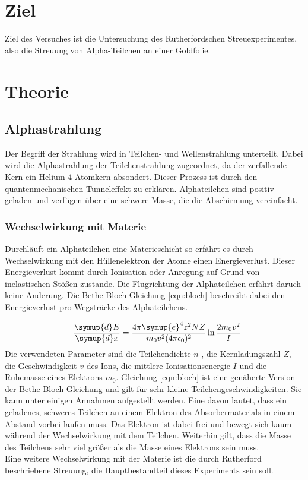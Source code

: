 \section{Ziel}
Ziel des Versuches ist die Untersuchung des Rutherfordschen Streuexperimentes,
also die Streuung von Alpha-Teilchen an einer Goldfolie.

\section{Theorie}
\subsection{Alphastrahlung}
Der Begriff der Strahlung wird in Teilchen- und Wellenstrahlung unterteilt. Dabei
wird die Alphastrahlung der Teilchenstrahlung zugeordnet, da der zerfallende
Kern ein Helium-4-Atomkern absondert. Dieser Prozess ist durch den quantenmechanischen
Tunneleffekt zu erklären. Alphateilchen sind positiv geladen und verfügen über
eine schwere Masse, die die Abschirmung vereinfacht. \cite{potsdam}

\subsubsection{Wechselwirkung mit Materie}
Durchläuft ein Alphateilchen eine Materieschicht so erfährt es durch
Wechselwirkung mit den Hüllenelektron der Atome einen Energieverlust. Dieser
Energieverlust kommt durch Ionisation oder Anregung auf Grund von inelastischen
Stößen zustande. Die Flugrichtung der Alphateilchen erfährt daruch keine
Änderung. Die Bethe-Bloch Gleichung \eqref{eqn:bloch} beschreibt dabei den
Energieverlust pro Wegsträcke des Alphateilchens.

\begin{equation}
- \frac{\symup{d} E}{\symup{d} x} = \frac{4 \pi \symup{e}^4 z^2 {N} {Z}}
{{m}_0 v^2 (4 \pi \epsilon_0)^2} \ln\frac{2 {m}_0 v^2}{{I}}
\label{eqn:bloch}
\end{equation}
Die verwendeten Parameter sind die Teilchendichte $n$
, die Kernladungszahl $Z$, die Geschwindigkeit $v$ des Ions, die mittlere
Ionisationsenergie $I$ und die Ruhemasse eines Elektrons ${m}_0$.
Gleichung \eqref{eqn:bloch} ist eine genäherte Version der Bethe-Bloch-Gleichung
und gilt für sehr kleine Teilchengeschwindigkeiten. Sie kann unter einigen
Annahmen aufgestellt werden. Eine davon lautet, dass ein geladenes, schweres
Teilchen an einem Elektron des Absorbermaterials in einem Abstand vorbei laufen
muss. Das Elektron ist dabei frei und bewegt sich kaum während der Wechselwirkung
mit dem Teilchen. Weiterhin gilt, dass die Masse des Teilchens sehr viel größer
als die Masse eines Elektrons sein muss.
\\
Eine weitere Wechselwirkung mit der Materie ist die durch Rutherford beschriebene
Streuung, die Hauptbestandteil dieses Experiments sein soll.

